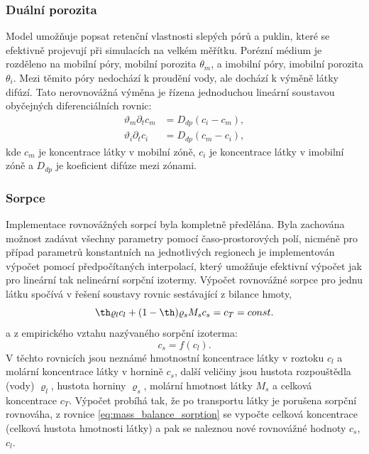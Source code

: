 \documentclass[11pt]{report}
\begin{document}
\subsubsection{Duální porozita}
Model umožňuje popsat retenční vlastnosti slepých pórů a puklin, které se 
efektivně projevují při simulacích na velkém měřítku. Porézní médium je 
rozděleno na mobilní póry, mobilní porozita $\theta_m$, a imobilní póry, 
imobilní porozita $\theta_i$. Mezi těmito póry nedochází k proudění vody, ale 
dochází k výměně látky difúzí. Tato nerovnovážná výměna je řízena jednoduchou 
lineární soustavou obyčejných diferenciálních rovnic:
\begin{align}
    \vartheta_m \partial_t c_m &= D_{dp} ( c_i - c_m), 
\label{eqn:dual_porosity_ode1}\\
    \vartheta_i \partial_t c_i &= D_{dp} ( c_m - c_i), 
\label{eqn:dual_porosity_ode2}
\end{align}
kde $c_m$ je koncentrace látky v mobilní zóně, $c_i$ je koncentrace látky v 
imobilní zóně a $D_{dp}$ je koeficient difúze mezi zónami.


\subsubsection{Sorpce}
Implementace rovnovážných sorpcí byla kompletně předělána. Byla zachována 
možnost zadávat všechny parametry pomocí časo-prostorových polí, nicméně pro 
případ parametrů konstantních na jednotlivých regionech je implementován výpočet 
pomocí předpočítaných interpolací, který umožňuje efektivní výpočet jak pro 
lineární tak nelineární sorpční izotermy. Výpočet rovnovážné sorpce pro jednu 
látku spočívá v řešení soustavy rovnic sestávající z bilance hmoty,
\begin{equation}
\label{eq:mass_balance_sorption}
\th \varrho_l c_l + (1-\th) \varrho_s M_s c_s = c_T = const.
\end{equation}
a z empirického vztahu nazývaného sorpční izoterma:
\[
    c_s=f(c_l).
\]
V těchto rovnicích jsou neznámé hmotnostní koncentrace látky v roztoku $c_l$ a 
molární koncentrace látky v hornině $c_s$, další veličiny jsou hustota 
rozpouštědla (vody) $\varrho_l$, hustota horniny $\varrho_s$, molární hmotnost 
látky $M_s$ a celková koncentrace $c_T$. Výpočet probíhá tak, že po transportu 
látky je porušena sorpční rovnováha, z rovnice \eqref{eq:mass_balance_sorption} 
se vypočte celková koncentrace (celková hustota hmotnosti látky) a pak se 
naleznou nové rovnovážné hodnoty $c_s$, $c_l$.
\end{document}
